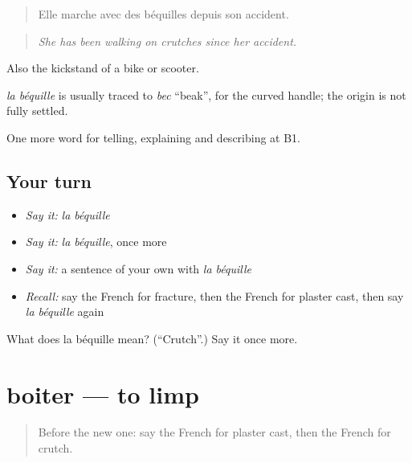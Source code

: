 \begin{quote}
Elle marche avec des béquilles depuis son accident.
\end{quote}

\begin{quote}
\emph{She has been walking on crutches since her accident.}
\end{quote}

Also the kickstand of a bike or scooter.

\begin{cousinweb}
\emph{la béquille} is usually traced to \emph{bec} \textquotedblleft{}beak\textquotedblright{}, for the curved handle; the origin is not fully settled.
\end{cousinweb}

\begin{grammarlens}[title={What you've built}]
One more word for telling, explaining and describing at B1.
\end{grammarlens}

\subsection*{Your turn}
\begin{itemize}
\raggedright
  \item \emph{Say it:} \emph{la béquille}
  \item \emph{Say it:} \emph{la béquille}, once more
  \item \emph{Say it:} a sentence of your own with \emph{la béquille}
  \item \emph{Recall:} say the French for fracture, then the French for plaster cast, then say \emph{la béquille} again
\end{itemize}

\begin{tcolorbox}[breakable,colback=teal!4,colframe=teal!35!black,title={Before you move on}]
What does la béquille mean? (\textquotedblleft{}Crutch\textquotedblright{}.) Say it once more.
\end{tcolorbox}
\section[boiter]{boiter — to limp}

\label{lesson:FR-C480-boiter}



\begin{quote}
Before the new one: say the French for plaster cast, then the French for crutch.
\end{quote}

